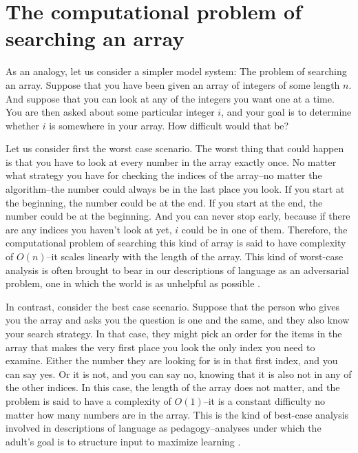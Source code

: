 \documentclass[review]{elsarticle}
\begin{document}
\section{The computational problem of searching an array}

As an analogy, let us consider a simpler model system: The problem of searching an array. Suppose that you have been given an array of integers of some length $n$. And suppose that you can look at any of the integers you want one at a time. You are then asked about some particular integer $i$, and your goal is to determine whether $i$ is somewhere in your array. How difficult would that be? 

Let us consider first the worst case scenario. The worst thing that could happen is that you have to look at every number in the array exactly once. No matter what strategy you have for checking the indices of the array--no matter the algorithm--the number could always be in the last place you look. If you start at the beginning, the number could be at the end. If you start at the end, the number could be at the beginning. And you can never stop early, because if there are any indices you haven't look at yet, $i$ could be in one of them. Therefore, the computational problem of searching this kind of array is said to have complexity of $O\left(n\right)$--it scales linearly with the length of the array. This kind of worst-case analysis is often brought to bear in our descriptions of language as an adversarial problem, one in which the world is as unhelpful as possible \citep[e.g.][]{gold1967, blythe2010}.

In contrast, consider the best case scenario. Suppose that the person who gives you the array and asks you the question is one and the same, and they also know your search strategy. In that case, they might pick an order for the items in the array that makes the very first place you look the only index you need to examine. Either the number they are looking for is in that first index, and you can say yes. Or it is not, and you can say no, knowing that it is also not in any of the other indices. In this case, the length of the array does not matter, and the problem is said to have a complexity of  $O\left(1\right)$--it is a constant difficulty no matter how many numbers are in the array. This is the kind of best-case analysis involved in descriptions of language as pedagogy--analyses under which the adult's goal is to structure input to maximize learning \citep{bonawitz2011, csibra2009, shafto2012}.
\end{document}
